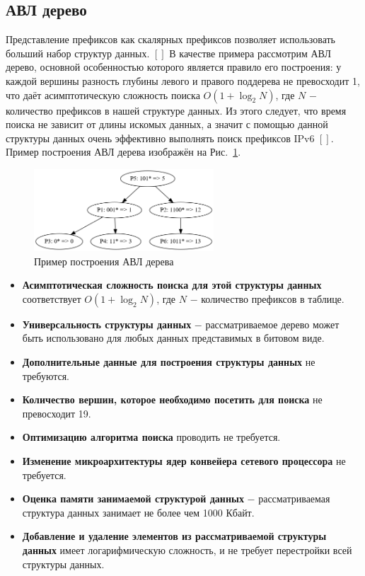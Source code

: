 \documentclass[a4paper, 12pt, titlepage, finall]{extreport}
\begin{document}
        \subsection{АВЛ дерево}
            Представление префиксов как скалярных префиксов позволяет использовать больший набор структур данных. $[ ]$ 
            В качестве примера рассмотрим АВЛ дерево, основной особенностью которого является правило его построения: у каждой вершины разность 
            глубины левого и правого поддерева не превосходит 1, что даёт асимптотическую сложность поиска {\ttfamily $O(1+\log_2{N})$}, 
            где {\ttfamily $N$} $-$ количество префиксов в нашей структуре данных. Из этого следует, что время поиска не зависит от длины искомых данных,
            а значит с помощью данной структуры данных очень эффективно выполнять поиск префиксов IPv6 $[ ]$.
            Пример построения АВЛ дерева изображён на Рис.~\ref{fig:mesh5}.
            \\
            \begin{figure}[ht]
                \centering
                \includegraphics[width=0.6\textwidth]{avl_tree.png}
                \caption{Пример построения АВЛ дерева}\label{fig:mesh5}
            \end{figure}
            \begin{itemize}
                \item\textbf{Асимптотическая сложность поиска для этой структуры данных} соответствует {\ttfamily $O(1 + \log_2{N})$},
                где {\ttfamily $N$} $-$ количество префиксов в таблице.
                \item\textbf{Универсальность структуры данных} $-$ рассматриваемое дерево может быть использовано для любых данных представимых в битовом виде.
                \item\textbf{Дополнительные данные для построения структуры данных} не требуются.
                \item\textbf{Количество вершин, которое необходимо посетить для поиска} не превосходит 19.
                \item\textbf{Оптимизацию алгоритма поиска} проводить не требуется.
                \item\textbf{Изменение микроархитектуры ядер конвейера сетевого процессора} не требуется.
                \item\textbf{Оценка памяти занимаемой структурой данных} $-$ рассматриваемая структура данных занимает не более чем 1000 Кбайт.
                \item\textbf{Добавление и удаление элементов из рассматриваемой структуры данных} имеет логарифмическую сложность, и не требует перестройки всей структуры данных.
            \end{itemize}
\end{document}
